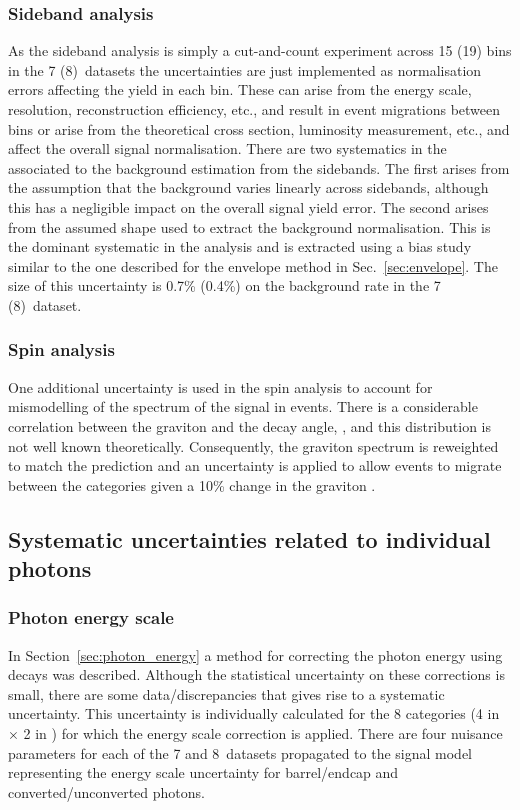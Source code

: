 \subsubsection{Sideband analysis}

As the sideband analysis is simply a cut-and-count experiment across 15 (19) bins in the 7 (8)~\TeV datasets the uncertainties are just implemented as normalisation errors affecting the yield in each bin. These can arise from the energy scale, resolution, reconstruction efficiency, etc., and result in event migrations between bins or arise from the theoretical cross section, luminosity measurement, etc., and affect the overall signal normalisation. There are two systematics in the \SMVA associated to the background estimation from the sidebands. The first arises from the assumption that the background varies linearly across sidebands, although this has a negligible impact on the overall signal yield error. The second arises from the assumed shape used to extract the background normalisation. This is the dominant systematic in the analysis and is extracted using a bias study similar to the one described for the envelope method in Sec.~\ref{sec:envelope}. The size of this uncertainty is 0.7\% (0.4\%) on the background rate in the 7 (8)~\TeV dataset.

\subsubsection{Spin analysis}

One additional uncertainty is used in the spin analysis to account for mismodelling of the \pT spectrum of the signal in \MC events. There is a considerable correlation between the graviton \pT and the decay angle, \costhetastar, and this distribution is not well known theoretically. Consequently, the graviton \pT spectrum is reweighted to match the \SM prediction and an uncertainty is applied to allow events to migrate between the \abscostheta categories given a 10\% change in the graviton \pT.

\subsection{Systematic uncertainties related to individual photons}

\subsubsection{Photon energy scale}
In Section~\ref{sec:photon_energy} a method for correcting the photon energy using \Zee decays was described. Although the statistical uncertainty on these corrections is small, there are some data/\MC discrepancies that gives rise to a systematic uncertainty. This uncertainty is individually calculated for the 8 categories (4 in \eta $\times$ 2 in \rnine) for which the energy scale correction is applied. There are four nuisance parameters for each of the 7 and 8~\TeV datasets propagated to the signal model representing the energy scale uncertainty for barrel/endcap and converted/unconverted photons.

